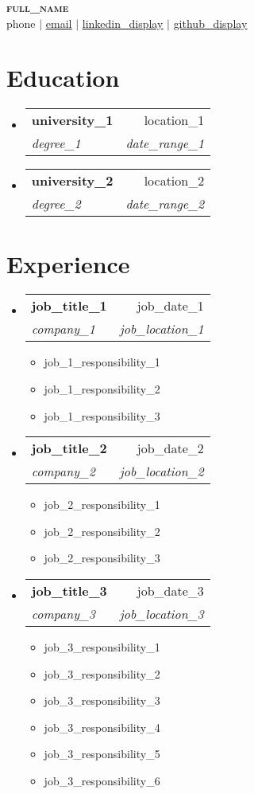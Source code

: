 \documentclass[letterpaper,11pt]{article}
\makeatletter
\newcommand{\resumeItem}[1]{
  \item\small{
    {#1 \vspace{-2pt}}
  }
}
\newcommand{\resumeSubheading}[4]{
  \vspace{-2pt}\item
    \begin{tabular*}{0.97\textwidth}[t]{l@{\extracolsep{\fill}}r}
      \textbf{#1} & #2 \\
      \textit{\small#3} & \textit{\small #4} \\
    \end{tabular*}\vspace{-7pt}
}
\newcommand{\resumeSubHeadingListStart}{\begin{itemize}[leftmargin=0.15in, label={}]}
\newcommand{\resumeSubHeadingListEnd}{\end{itemize}}
\newcommand{\resumeItemListStart}{\begin{itemize}}
\newcommand{\resumeItemListEnd}{\end{itemize}\vspace{-5pt}}
\makeatother
\begin{document}
\begin{center}
    \textbf{\Huge \scshape {{full_name}}} \\ \vspace{1pt}
    \small {{phone}} $|$ \href{mailto:{{email}}}{\underline{{{email}}}} $|$ 
    \href{{{linkedin_url}}}{\underline{{{linkedin_display}}}} $|$
    \href{{{github_url}}}{\underline{{{github_display}}}}
\end{center}


\section{Education}
  \resumeSubHeadingListStart
    \resumeSubheading
      {{university_1}}{{{location_1}}}
      {{degree_1}}{{{date_range_1}}}
    \resumeSubheading
      {{university_2}}{{{location_2}}}
      {{degree_2}}{{{date_range_2}}}
  \resumeSubHeadingListEnd


\section{Experience}
  \resumeSubHeadingListStart

    \resumeSubheading
      {{job_title_1}}{{{job_date_1}}}
      {{company_1}}{{{job_location_1}}}
      \resumeItemListStart
        \resumeItem{{job_1_responsibility_1}}
        \resumeItem{{job_1_responsibility_2}}
        \resumeItem{{job_1_responsibility_3}}
      \resumeItemListEnd
      
    \resumeSubheading
      {{job_title_2}}{{{job_date_2}}}
      {{company_2}}{{{job_location_2}}}
      \resumeItemListStart
        \resumeItem{{job_2_responsibility_1}}
        \resumeItem{{job_2_responsibility_2}}
        \resumeItem{{job_2_responsibility_3}}
    \resumeItemListEnd

    \resumeSubheading
      {{job_title_3}}{{{job_date_3}}}
      {{company_3}}{{{job_location_3}}}
      \resumeItemListStart
        \resumeItem{{job_3_responsibility_1}}
        \resumeItem{{job_3_responsibility_2}}
        \resumeItem{{job_3_responsibility_3}}
        \resumeItem{{job_3_responsibility_4}}
        \resumeItem{{job_3_responsibility_5}}
        \resumeItem{{job_3_responsibility_6}}
      \resumeItemListEnd

  \resumeSubHeadingListEnd


\end{document}
